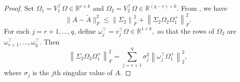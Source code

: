 \documentclass[onefignum,onetabnum]{siamart251216}
\newcommand{\R}{\mathbb{R}}
\newcommand{\norm}[1]{\left\lVert #1 \right\rVert}
\newcommand{\range}{\operatorname{range}}
\newcommand{\argmin}{\operatorname*{argmin}}
\begin{document}
\begin{proof}

Set $\Omega_1 = V_1^\top\Omega \in \R^{r\times k}$ and $\Omega_2 = V_2^\top\Omega \in \R^{(q-r)\times k}$. From \cite[Theorem 9.1]{HalkoMartinssonTropp2011}, we have
\[
\|A-\widetilde A\|_F^2
\le
\norm{\Sigma_2}_F^2
+
\norm{\Sigma_2\Omega_2\Omega_1^+}_F^2.
\]
For each $j=r+1,\dots,q$, define
$
\omega_j^\top = v_j^\top\Omega \in \R^{1\times k},
$
so that the rows of $\Omega_2$ are $\omega_{r+1}^\top,\dots,\omega_q^\top$.  Then
\[
\norm{\Sigma_2\Omega_2\Omega_1^+}_F^2
=
\sum_{j=r+1}^q \sigma_j^2 \norm{\omega_j^\top\Omega_1^+}_2^2,
\]
where $\sigma_j$ is the $j$th singular value of $A$. 


\end{proof}
\end{document}
